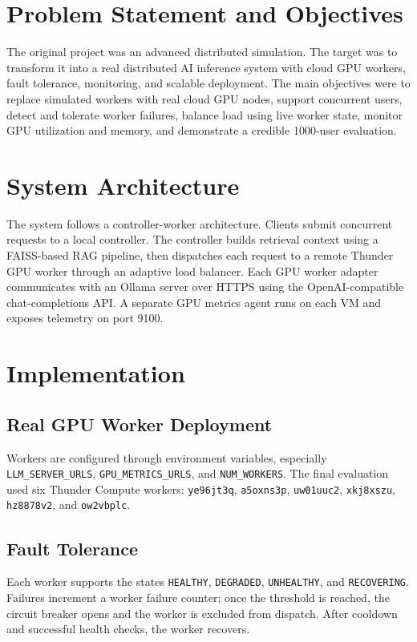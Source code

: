 \documentclass[conference]{IEEEtran}
\begin{document}
\section{Problem Statement and Objectives}
The original project was an advanced distributed simulation. The target was to transform it into a real distributed AI inference system with cloud GPU workers, fault tolerance, monitoring, and scalable deployment. The main objectives were to replace simulated workers with real cloud GPU nodes, support concurrent users, detect and tolerate worker failures, balance load using live worker state, monitor GPU utilization and memory, and demonstrate a credible 1000-user evaluation.

\section{System Architecture}
The system follows a controller-worker architecture. Clients submit concurrent requests to a local controller. The controller builds retrieval context using a FAISS-based RAG pipeline, then dispatches each request to a remote Thunder GPU worker through an adaptive load balancer. Each GPU worker adapter communicates with an Ollama server over HTTPS using the OpenAI-compatible chat-completions API. A separate GPU metrics agent runs on each VM and exposes telemetry on port 9100.


\section{Implementation}
\subsection{Real GPU Worker Deployment}
Workers are configured through environment variables, especially \texttt{LLM\_SERVER\_URLS}, \texttt{GPU\_METRICS\_URLS}, and \texttt{NUM\_WORKERS}. The final evaluation used six Thunder Compute workers: \texttt{ye96jt3q}, \texttt{a5oxns3p}, \texttt{uw01uuc2}, \texttt{xkj8xszu}, \texttt{hz8878v2}, and \texttt{ow2vbplc}.

\subsection{Fault Tolerance}
Each worker supports the states \texttt{HEALTHY}, \texttt{DEGRADED}, \texttt{UNHEALTHY}, and \texttt{RECOVERING}. Failures increment a worker failure counter; once the threshold is reached, the circuit breaker opens and the worker is excluded from dispatch. After cooldown and successful health checks, the worker recovers.
\end{document}
